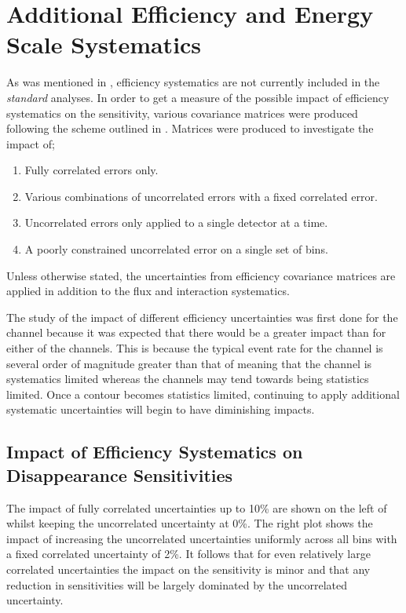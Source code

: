 \section{Additional Efficiency and Energy Scale Systematics}

As was mentioned in , efficiency systematics are not currently included in the \textit{standard} analyses. In order to get a measure of the possible impact of efficiency systematics on the sensitivity, various covariance matrices were produced following the scheme outlined in . Matrices were produced to investigate the impact of;
\begin{enumerate}
    \item Fully correlated errors only.
    \item Various combinations of uncorrelated errors with a fixed correlated error.
    \item Uncorrelated errors only applied to a single detector at a time.
    \item A poorly constrained uncorrelated error on a single set of bins.
\end{enumerate}
Unless otherwise stated, the uncertainties from efficiency covariance matrices are applied in addition to the flux and interaction systematics. 

The study of the impact of different efficiency uncertainties was first done for the \numu channel because it was expected that there would be a greater impact than for either of the \nue channels. This is because the typical event rate for the \numu channel is several order of magnitude greater than that of \nue meaning that the \numu channel is systematics limited whereas the \nue channels may tend towards being statistics limited. Once a contour becomes statistics limited, continuing to apply additional systematic uncertainties will begin to have diminishing impacts. 

\subsection{\texorpdfstring{Impact of Efficiency Systematics on \numu Disappearance Sensitivities}{Impact of Efficiency Systematics on numu Disappearance Sensitivities}}


The impact of fully correlated uncertainties up to 10\% are shown on the left of  whilst keeping the uncorrelated uncertainty at 0\%. The right plot shows the impact of increasing the uncorrelated uncertainties uniformly across all bins with a fixed correlated uncertainty of 2\%. It follows that for even relatively large correlated uncertainties the impact on the sensitivity is minor and that any reduction in sensitivities will be largely dominated by the uncorrelated uncertainty. 

